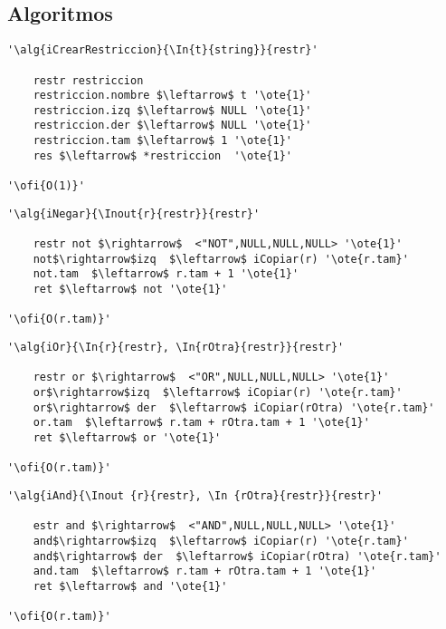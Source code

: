 \subsection{Algoritmos}

\lstset{style=alg}

\begin{lstlisting}[mathescape]
'\alg{iCrearRestriccion}{\In{t}{string}}{restr}'
    
    restr restriccion
    restriccion.nombre $\leftarrow$ t '\ote{1}'
    restriccion.izq $\leftarrow$ NULL '\ote{1}'
    restriccion.der $\leftarrow$ NULL '\ote{1}'
    restriccion.tam $\leftarrow$ 1 '\ote{1}'
    res $\leftarrow$ *restriccion  '\ote{1}'
    
'\ofi{O(1)}'
\end{lstlisting}

\begin{lstlisting}[mathescape]
'\alg{iNegar}{\Inout{r}{restr}}{restr}'
    
    restr not $\rightarrow$  <"NOT",NULL,NULL,NULL> '\ote{1}'
    not$\rightarrow$izq  $\leftarrow$ iCopiar(r) '\ote{r.tam}'
    not.tam  $\leftarrow$ r.tam + 1 '\ote{1}'
    ret $\leftarrow$ not '\ote{1}'
   
'\ofi{O(r.tam)}'
\end{lstlisting}

\begin{lstlisting}[mathescape]
'\alg{iOr}{\In{r}{restr}, \In{rOtra}{restr}}{restr}'

    restr or $\rightarrow$  <"OR",NULL,NULL,NULL> '\ote{1}'
    or$\rightarrow$izq  $\leftarrow$ iCopiar(r) '\ote{r.tam}'
    or$\rightarrow$ der  $\leftarrow$ iCopiar(rOtra) '\ote{r.tam}'
    or.tam  $\leftarrow$ r.tam + rOtra.tam + 1 '\ote{1}'
    ret $\leftarrow$ or '\ote{1}'
    
'\ofi{O(r.tam)}'
\end{lstlisting}

\begin{lstlisting}[mathescape]
'\alg{iAnd}{\Inout {r}{restr}, \In {rOtra}{restr}}{restr}'
    
    estr and $\rightarrow$  <"AND",NULL,NULL,NULL> '\ote{1}'
    and$\rightarrow$izq  $\leftarrow$ iCopiar(r) '\ote{r.tam}'
    and$\rightarrow$ der  $\leftarrow$ iCopiar(rOtra) '\ote{r.tam}'
    and.tam  $\leftarrow$ r.tam + rOtra.tam + 1 '\ote{1}'
    ret $\leftarrow$ and '\ote{1}'
    
'\ofi{O(r.tam)}'
\end{lstlisting}

